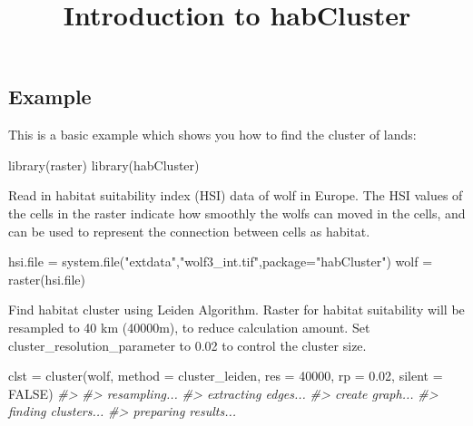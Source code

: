 \documentclass[
]{article}
\title{Introduction to habCluster}
\author{}
\date{\vspace{-2.5em}}
\newenvironment{Shaded}{\begin{snugshade}}{\end{snugshade}}
\newcommand{\AttributeTok}[1]{\textcolor[rgb]{0.77,0.63,0.00}{#1}}
\newcommand{\CommentTok}[1]{\textcolor[rgb]{0.56,0.35,0.01}{\textit{#1}}}
\newcommand{\ConstantTok}[1]{\textcolor[rgb]{0.00,0.00,0.00}{#1}}
\newcommand{\DecValTok}[1]{\textcolor[rgb]{0.00,0.00,0.81}{#1}}
\newcommand{\FloatTok}[1]{\textcolor[rgb]{0.00,0.00,0.81}{#1}}
\newcommand{\FunctionTok}[1]{\textcolor[rgb]{0.00,0.00,0.00}{#1}}
\newcommand{\NormalTok}[1]{#1}
\newcommand{\OtherTok}[1]{\textcolor[rgb]{0.56,0.35,0.01}{#1}}
\newcommand{\StringTok}[1]{\textcolor[rgb]{0.31,0.60,0.02}{#1}}
\begin{document}
\maketitle

\hypertarget{example}{%
\subsection{Example}\label{example}}

This is a basic example which shows you how to find the cluster of
lands:

\begin{Shaded}
\begin{Highlighting}[]
\FunctionTok{library}\NormalTok{(raster)}
\FunctionTok{library}\NormalTok{(habCluster)}
\end{Highlighting}
\end{Shaded}

Read in habitat suitability index (HSI) data of wolf in Europe. The HSI
values of the cells in the raster indicate how smoothly the wolfs can
moved in the cells, and can be used to represent the connection between
cells as habitat.

\begin{Shaded}
\begin{Highlighting}[]
\NormalTok{hsi.file }\OtherTok{=} \FunctionTok{system.file}\NormalTok{(}\StringTok{"extdata"}\NormalTok{,}\StringTok{"wolf3\_int.tif"}\NormalTok{,}\AttributeTok{package=}\StringTok{"habCluster"}\NormalTok{)}
\NormalTok{wolf }\OtherTok{=} \FunctionTok{raster}\NormalTok{(hsi.file)}
\end{Highlighting}
\end{Shaded}

Find habitat cluster using Leiden Algorithm. Raster for habitat
suitability will be resampled to 40 km (40000m), to reduce calculation
amount. Set cluster\_resolution\_parameter to 0.02 to control the
cluster size.

\begin{Shaded}
\begin{Highlighting}[]
\NormalTok{clst }\OtherTok{=} \FunctionTok{cluster}\NormalTok{(wolf, }\AttributeTok{method =}\NormalTok{ cluster\_leiden, }\AttributeTok{res =} \DecValTok{40000}\NormalTok{, }\AttributeTok{rp =} \FloatTok{0.02}\NormalTok{, }\AttributeTok{silent =} \ConstantTok{FALSE}\NormalTok{)}
\CommentTok{\#\textgreater{} }
\CommentTok{\#\textgreater{} resampling...}
\CommentTok{\#\textgreater{} extracting edges...}
\CommentTok{\#\textgreater{} create graph...}
\CommentTok{\#\textgreater{} finding clusters...}
\CommentTok{\#\textgreater{} preparing results...}
\end{Highlighting}
\end{Shaded}
\end{document}
